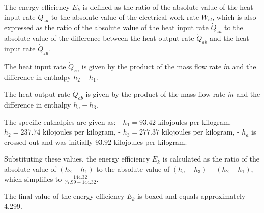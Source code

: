 The energy efficiency \( E_k \) is defined as the ratio of the absolute value of the heat input rate \( \dot{Q}_{zu} \) to the absolute value of the electrical work rate \( \dot{W}_{el} \), which is also expressed as the ratio of the absolute value of the heat input rate \( \dot{Q}_{zu} \) to the absolute value of the difference between the heat output rate \( \dot{Q}_{ab} \) and the heat input rate \( \dot{Q}_{zu} \).

The heat input rate \( \dot{Q}_{zu} \) is given by the product of the mass flow rate \( \dot{m} \) and the difference in enthalpy \( h_2 - h_1 \).

The heat output rate \( \dot{Q}_{ab} \) is given by the product of the mass flow rate \( \dot{m} \) and the difference in enthalpy \( h_a - h_3 \).

The specific enthalpies are given as:
- \( h_1 = 93.42 \) kilojoules per kilogram,
- \( h_2 = 237.74 \) kilojoules per kilogram,
- \( h_3 = 277.37 \) kilojoules per kilogram,
- \( h_a \) is crossed out and was initially \( 93.92 \) kilojoules per kilogram.

Substituting these values, the energy efficiency \( E_k \) is calculated as the ratio of the absolute value of \( (h_2 - h_1) \) to the absolute value of \( (h_a - h_3) - (h_2 - h_1) \), which simplifies to \( \frac{144.32}{77.99 - 144.32} \).

The final value of the energy efficiency \( E_k \) is boxed and equals approximately 4.299.